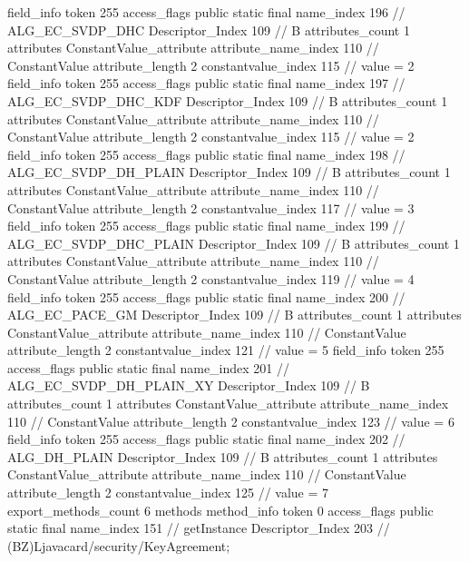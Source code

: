 {{{{{{{				}
				}
			}
			field_info {
				token	255
				access_flags	public static final
				name_index	196		// ALG_EC_SVDP_DHC
				Descriptor_Index	109		// B
				attributes_count	1
				attributes {
				ConstantValue_attribute {
					attribute_name_index	110		// ConstantValue
					attribute_length	2
					constantvalue_index	115		// value = 2
				}
				}
			}
			field_info {
				token	255
				access_flags	public static final
				name_index	197		// ALG_EC_SVDP_DHC_KDF
				Descriptor_Index	109		// B
				attributes_count	1
				attributes {
				ConstantValue_attribute {
					attribute_name_index	110		// ConstantValue
					attribute_length	2
					constantvalue_index	115		// value = 2
				}
				}
			}
			field_info {
				token	255
				access_flags	public static final
				name_index	198		// ALG_EC_SVDP_DH_PLAIN
				Descriptor_Index	109		// B
				attributes_count	1
				attributes {
				ConstantValue_attribute {
					attribute_name_index	110		// ConstantValue
					attribute_length	2
					constantvalue_index	117		// value = 3
				}
				}
			}
			field_info {
				token	255
				access_flags	public static final
				name_index	199		// ALG_EC_SVDP_DHC_PLAIN
				Descriptor_Index	109		// B
				attributes_count	1
				attributes {
				ConstantValue_attribute {
					attribute_name_index	110		// ConstantValue
					attribute_length	2
					constantvalue_index	119		// value = 4
				}
				}
			}
			field_info {
				token	255
				access_flags	public static final
				name_index	200		// ALG_EC_PACE_GM
				Descriptor_Index	109		// B
				attributes_count	1
				attributes {
				ConstantValue_attribute {
					attribute_name_index	110		// ConstantValue
					attribute_length	2
					constantvalue_index	121		// value = 5
				}
				}
			}
			field_info {
				token	255
				access_flags	public static final
				name_index	201		// ALG_EC_SVDP_DH_PLAIN_XY
				Descriptor_Index	109		// B
				attributes_count	1
				attributes {
				ConstantValue_attribute {
					attribute_name_index	110		// ConstantValue
					attribute_length	2
					constantvalue_index	123		// value = 6
				}
				}
			}
			field_info {
				token	255
				access_flags	public static final
				name_index	202		// ALG_DH_PLAIN
				Descriptor_Index	109		// B
				attributes_count	1
				attributes {
				ConstantValue_attribute {
					attribute_name_index	110		// ConstantValue
					attribute_length	2
					constantvalue_index	125		// value = 7
				}
				}
			}
			}
			export_methods_count	6
			methods {
				method_info {
					token	0
					access_flags	public static final
					name_index	151		// getInstance
					Descriptor_Index	203		// (BZ)Ljavacard/security/KeyAgreement;
}}}}}

